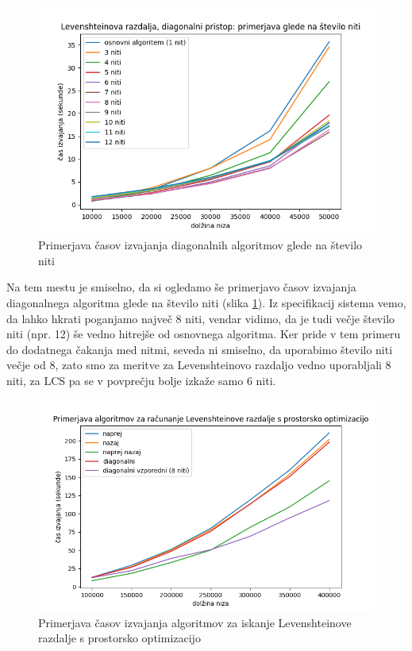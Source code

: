 \documentclass[a4paper,12pt,openright]{book}
\begin{document}
\begin{figure}[H]
\centering
\includegraphics[width=1.0\textwidth]{plots/nThreads.png}
\caption{Primerjava časov izvajanja diagonalnih algoritmov glede na število niti}
\label{comparison5}
\end{figure}

Na tem mestu je smiselno, da si ogledamo še primerjavo časov izvajanja diagonalnega algoritma glede na število niti (slika \ref{comparison5}). Iz specifikacij sistema vemo, da lahko hkrati poganjamo največ 8 niti, vendar vidimo, da je tudi večje število niti (npr. 12) še vedno hitrejše od osnovnega algoritma. Ker pride v tem primeru do dodatnega čakanja med nitmi, seveda ni smiselno, da uporabimo število niti večje od 8, zato smo za meritve za Levenshteinovo razdaljo vedno uporabljali 8 niti, za LCS pa se v povprečju bolje izkaže samo 6 niti. 

\begin{figure}[H]
\centering
\includegraphics[width=1.0\textwidth]{plots/LevenshteinSpace.png}
\caption{Primerjava časov izvajanja algoritmov za iskanje Levenshteinove razdalje s prostorsko optimizacijo}
\label{comparison6}
\end{figure}
\end{document}
